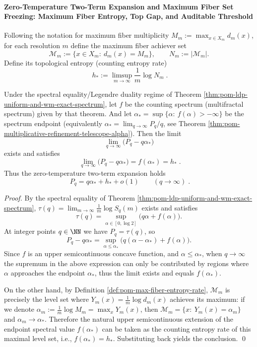 \paragraph{Zero-Temperature Two-Term Expansion and Maximum Fiber Set Freezing: Maximum Fiber Entropy, Top Gap, and Auditable Threshold}

\begin{definition}\label{def:pom-max-fiber-entropy-rate}
Following the notation for maximum fiber multiplicity \(M_m:=\max_{x\in X_m}d_m(x)\),
for each resolution \(m\) define the maximum fiber achiever set
\[
\mathcal{M}_m:=\{x\in X_m:\ d_m(x)=M_m\},
\qquad
N_m:=|\mathcal{M}_m|.
\]
Define its topological entropy (counting entropy rate)
\[
\boxed{\;
h_\ast:=\limsup_{m\to\infty}\frac{1}{m}\log N_m\; }.
\]
\end{definition}

\begin{theorem}\label{thm:pom-zero-temperature-two-term-expansion-maxfiber-entropy}
Under the spectral equality/Legendre duality regime of Theorem \ref{thm:pom-ldp-uniform-and-wm-exact-spectrum},
let \(f\) be the counting spectrum (multifractal spectrum) given by that theorem.
And let
\(
\alpha_\ast=\sup\{\alpha:\ f(\alpha)>-\infty\}
\)
be the spectrum endpoint (equivalently \(\alpha_\ast=\lim_{q\to\infty}P_q/q\), see Theorem \ref{thm:pom-multiplicative-refinement-telescope-alpha}).
Then the limit
\[
\lim_{q\to\infty}\bigl(P_q-q\alpha_\ast\bigr)
\]
exists and satisfies
\[
\boxed{\;
\lim_{q\to\infty}\bigl(P_q-q\alpha_\ast\bigr)
=
f(\alpha_\ast)
=
h_\ast\; }.
\]
Thus the zero-temperature two-term expansion holds
\[
\boxed{\;
P_q=q\alpha_\ast+h_\ast+o(1)\qquad(q\to\infty)\; }.
\]
\end{theorem}
\begin{proof}
By the spectral equality of Theorem \ref{thm:pom-ldp-uniform-and-wm-exact-spectrum},
\(\tau(q)=\lim_{m\to\infty}\frac{1}{m}\log S_q(m)\) exists and satisfies
\[
\tau(q)=\sup_{\alpha\in[0,\log 2]}\bigl(q\alpha+f(\alpha)\bigr).
\]
At integer points \(q\in\NN\) we have \(P_q=\tau(q)\), so
\[
P_q-q\alpha_\ast
=
\sup_{\alpha\le \alpha_\ast}\bigl(q(\alpha-\alpha_\ast)+f(\alpha)\bigr).
\]
Since \(f\) is an upper semicontinuous concave function, and \(\alpha\le \alpha_\ast\), when \(q\to\infty\) the supremum in the above expression can only be contributed by regions where \(\alpha\) approaches the endpoint \(\alpha_\ast\), thus the limit exists and equals \(f(\alpha_\ast)\).
\par
On the other hand, by Definition \ref{def:pom-max-fiber-entropy-rate},
\(\mathcal{M}_m\) is precisely the level set where \(Y_m(x)=\frac1m\log d_m(x)\) achieves its maximum:
if we denote \(\alpha_m:=\frac1m\log M_m=\max_x Y_m(x)\), then
\(
\mathcal{M}_m=\{x:\ Y_m(x)=\alpha_m\}
\)
and \(\alpha_m\to\alpha_\ast\).
Therefore the natural upper semicontinuous extension of the endpoint spectral value \(f(\alpha_\ast)\) can be taken as the counting entropy rate of this maximal level set, i.e., \(f(\alpha_\ast)=h_\ast\).
Substituting back yields the conclusion. \qed
\end{proof}

